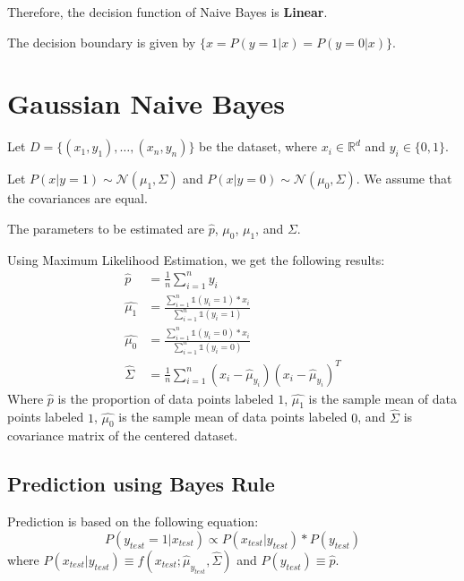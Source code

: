 \documentclass[
]{article}
\begin{document}
Therefore, the decision function of Naive Bayes is \textbf{Linear}.

The decision boundary is given by \(\{x=P(y=1|x)=P(y=0|x)\}\).

\hypertarget{gaussian-naive-bayes}{%
\section{Gaussian Naive Bayes}\label{gaussian-naive-bayes}}

Let \(D=\{(x_1, y_1), \ldots, (x_n,y_n)\}\) be the dataset, where
\(x_i \in \mathbb{R}^d\) and \(y_i \in \{0, 1\}\).

Let \(P(x|y=1)\sim\mathcal{N}(\mu_1,\Sigma)\) and
\(P(x|y=0)\sim\mathcal{N}(\mu_0,\Sigma)\). We assume that the
covariances are equal.

The parameters to be estimated are \(\hat{p}\), \(\mu_0\), \(\mu_1\),
and \(\Sigma\).

Using Maximum Likelihood Estimation, we get the following results:
\begin{align*} 
\hat{p}&=\frac{1}{n}\sum_{i=1}^ny_i \\
\hat{\mu_1} &= \frac{\displaystyle \sum_{i=1}^n\mathbb{1}(y_i=1)*x_i}{\displaystyle \sum_{i=1}^n\mathbb{1}(y_i=1)} \\
\hat{\mu_0} &= \frac{\displaystyle \sum_{i=1}^n\mathbb{1}(y_i=0)*x_i}{\displaystyle \sum_{i=1}^n\mathbb{1}(y_i=0)} \\
\hat{\Sigma} &= \frac{1}{n} \displaystyle \sum_{i=1}^n(x_i-\hat{\mu}_{y_i})(x_i-\hat{\mu}_{y_i})^T
\end{align*} Where \(\hat{p}\) is the proportion of data points labeled
\(1\), \(\hat{\mu_1}\) is the sample mean of data points labeled \(1\),
\(\hat{\mu_0}\) is the sample mean of data points labeled \(0\), and
\(\hat{\Sigma}\) is covariance matrix of the centered dataset.

\hypertarget{prediction-using-bayes-rule}{%
\subsection{Prediction using Bayes
Rule}\label{prediction-using-bayes-rule}}

Prediction is based on the following equation: \[
P(y_{test}=1|x_{test})\propto P(x_{test}|y_{test})*P(y_{test})
\] where
\(P(x_{test}|y_{test})\equiv f(x_{test};\hat{\mu}_{y_{test}}, \hat{\Sigma})\)
and \(P(y_{test})\equiv \hat{p}\).
\end{document}
